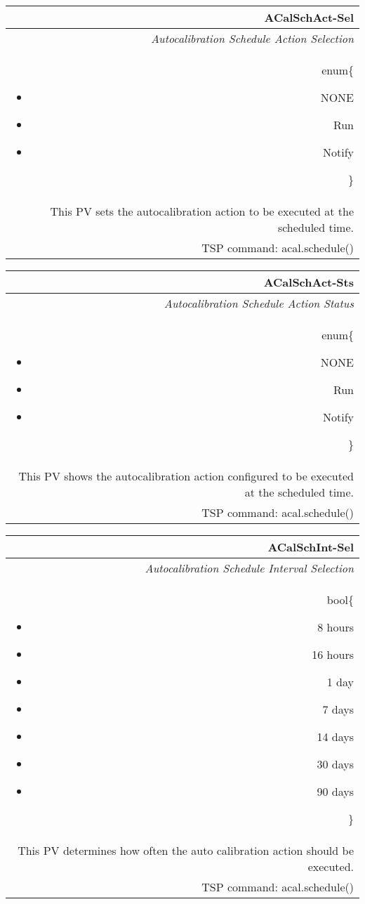 \documentclass[openany]{article}
\begin{document}
		\begin{tabular}{N}
			\hline
			\bfseries ACalSchAct-Sel\label{pv:acalschact-sel} \\ \hline
			\emph{Autocalibration Schedule Action Selection} \\
			enum\{\begin{itemize}[noitemsep]
				\small
				\item[] NONE
				\item[] Run
				\item[] Notify
			\end{itemize}\} \\
			This PV sets the autocalibration action to be executed at the scheduled time. \\
			TSP command: acal.schedule()
		\end{tabular}

		\begin{tabular}{N}
			\hline
			\bfseries ACalSchAct-Sts\label{pv:acalschact-sts} \\ \hline
			\emph{Autocalibration Schedule Action Status} \\
			enum\{\begin{itemize}[noitemsep]
				\small
				\item[] NONE
				\item[] Run
				\item[] Notify
			\end{itemize}\} \\
			This PV shows the autocalibration action configured to be executed at the scheduled time. \\
			TSP command: acal.schedule()
		\end{tabular}

		\begin{tabular}{N}
			\hline
			\bfseries ACalSchInt-Sel\label{pv:acalschint-sel} \\ \hline
			\emph{Autocalibration Schedule Interval Selection} \\
			bool\{\begin{itemize}[noitemsep]
				\small
				\item[] 8 hours
				\item[] 16 hours
				\item[] 1 day
				\item[] 7 days
				\item[] 14 days
				\item[] 30 days
				\item[] 90 days
			\end{itemize}\} \\
			This PV determines how often the auto calibration action should be executed. \\
			TSP command: acal.schedule()
		\end{tabular}
\end{document}
